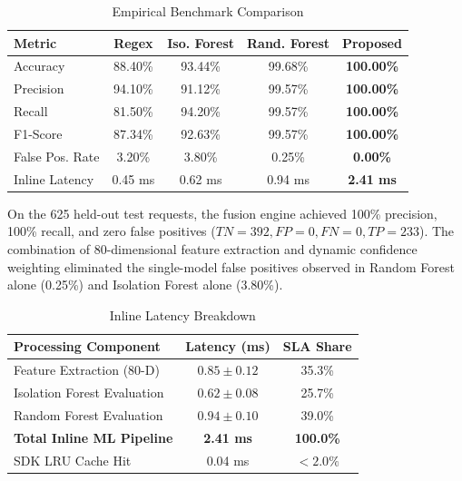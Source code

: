 \documentclass[conference]{IEEEtran}
\begin{document}
\begin{table}[htbp]
\caption{Empirical Benchmark Comparison}
\begin{center}
\begin{tabular}{lcccc}
\toprule
\textbf{Metric} & \textbf{Regex} & \textbf{Iso. Forest} & \textbf{Rand. Forest} & \textbf{Proposed} \\
\midrule
Accuracy & 88.40\% & 93.44\% & 99.68\% & \textbf{100.00\%} \\
Precision & 94.10\% & 91.12\% & 99.57\% & \textbf{100.00\%} \\
Recall & 81.50\% & 94.20\% & 99.57\% & \textbf{100.00\%} \\
F1-Score & 87.34\% & 92.63\% & 99.57\% & \textbf{100.00\%} \\
False Pos. Rate & 3.20\% & 3.80\% & 0.25\% & \textbf{0.00\%} \\
Inline Latency & 0.45 ms & 0.62 ms & 0.94 ms & \textbf{2.41 ms} \\
\bottomrule
\end{tabular}
\end{center}
\end{table}

On the 625 held-out test requests, the fusion engine achieved 100\% precision, 100\% recall, and zero false positives ($TN=392, FP=0, FN=0, TP=233$). The combination of 80-dimensional feature extraction and dynamic confidence weighting eliminated the single-model false positives observed in Random Forest alone (0.25\%) and Isolation Forest alone (3.80\%).

\begin{table}[htbp]
\caption{Inline Latency Breakdown}
\begin{center}
\begin{tabular}{lcc}
\toprule
\textbf{Processing Component} & \textbf{Latency (ms)} & \textbf{SLA Share} \\
\midrule
Feature Extraction (80-D) & $0.85 \pm 0.12$ & 35.3\% \\
Isolation Forest Evaluation & $0.62 \pm 0.08$ & 25.7\% \\
Random Forest Evaluation & $0.94 \pm 0.10$ & 39.0\% \\
\textbf{Total Inline ML Pipeline} & \textbf{2.41 ms} & \textbf{100.0\%} \\
SDK LRU Cache Hit & 0.04 ms & $< 2.0\%$ \\
\bottomrule
\end{tabular}
\end{center}
\end{table}
\end{document}
